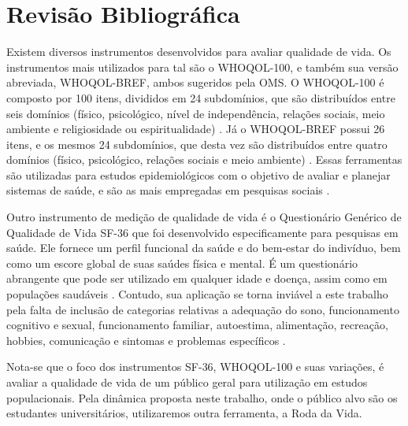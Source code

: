 \section{Revisão Bibliográfica}

Existem diversos instrumentos desenvolvidos para avaliar qualidade de vida. Os instrumentos mais utilizados para tal são o WHOQOL-100, e também sua versão abreviada, WHOQOL-BREF, ambos sugeridos pela OMS. O WHOQOL-100 é composto por 100 itens, divididos em 24 subdomínios, que são distribuídos entre seis domínios (físico, psicológico, nível de independência, relações sociais, meio ambiente e religiosidade ou espiritualidade) \cite{whoqol1995}.
Já o WHOQOL-BREF possui 26 itens, e os mesmos 24 subdomínios, que desta vez são distribuídos entre quatro domínios (físico, psicológico, relações sociais e meio ambiente) \cite{whoqol1995}. Essas ferramentas são utilizadas para estudos epidemiológicos com o objetivo de avaliar e planejar sistemas de saúde, e são as mais empregadas em pesquisas sociais \cite{gorenstein2015}.

Outro instrumento de medição de qualidade de vida é o Questionário Genérico de Qualidade de Vida SF-36 que foi desenvolvido especificamente para pesquisas em saúde. Ele fornece um perfil funcional da saúde e do bem-estar do indivíduo, bem como um escore global de suas saúdes física e mental. É um questionário abrangente que pode ser utilizado em qualquer idade e doença, assim como em populações saudáveis \cite{gorenstein2015}. Contudo, sua aplicação se torna inviável a este trabalho pela falta de inclusão de categorias relativas a adequação do sono, funcionamento cognitivo e sexual, funcionamento familiar, autoestima, alimentação, recreação, hobbies, comunicação e sintomas e problemas específicos \cite{gorenstein2015}.

Nota-se que o foco dos instrumentos SF-36, WHOQOL-100 e suas variações, é avaliar a qualidade de vida de um público geral para utilização em estudos populacionais. Pela dinâmica proposta neste trabalho, onde o público alvo são os estudantes universitários, utilizaremos outra ferramenta, a Roda da Vida.


